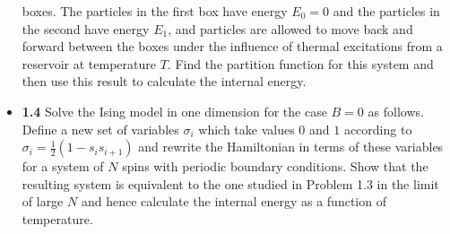 \documentclass{article}
\begin{document}
\begin{itemize}
boxes. The particles in the first box have energy $E_{0} = 0$ and the particles in the second have energy $E_{1}$, and
particles are allowed to move back and forward between the boxes under the influence of thermal excitations from a
reservoir at temperature $T$. Find the partition function for this system and then use this result to calculate the internal
energy.
\item \textbf{1.4} Solve the Ising model in one dimension for the case $B = 0$ as follows. Define a new set
of variables $\sigma_{i}$ which take values $0$ and $1$ according to
$\sigma_{i} = \frac{1}{2}(1 - s_{i}s_{i+1})$ and rewrite the Hamiltonian in terms of these
variables for a system of $N$ spins with periodic boundary conditions. Show that the resulting system is
equivalent to the one studied in Problem 1.3 in the limit of large $N$ and hence calculate the internal
energy as a function of temperature.
\end{itemize}
\end{document}
